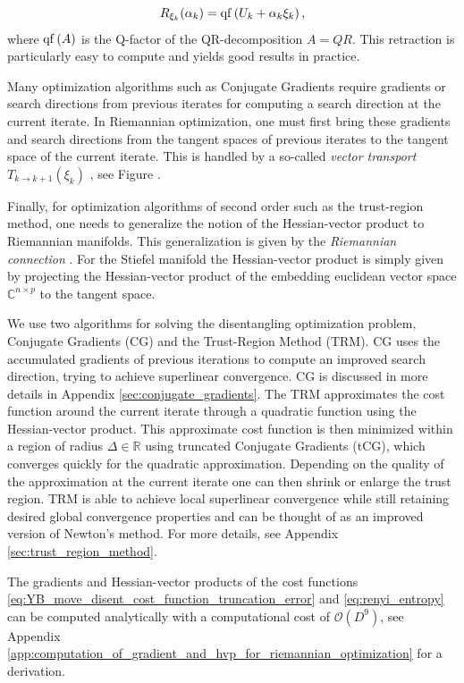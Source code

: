\begin{equation}
	R_{\xi_k}(\alpha_k) = \operatorname{qf}\left(U_k + \alpha_k\xi_k\right),
\end{equation}
where $\operatorname{qf}\left(A\right)$ is the Q-factor of the QR-decomposition $A = QR$. This retraction is particularly easy to compute and yields good results in practice. \par
Many optimization algorithms such as Conjugate Gradients require gradients or search directions from previous iterates for computing a search direction at the current iterate. In Riemannian optimization, one must first bring these gradients and search directions from the tangent spaces of previous iterates to the tangent space of the current iterate. This is handled by a so-called \textit{vector transport} $T_{k\rightarrow k+1}\left(\xi_k\right)$ \cite{cite:optimization_on_matrix_manifolds}, see Figure . \par
Finally, for optimization algorithms of second order such as the trust-region method, one needs to generalize the notion of the Hessian-vector product to Riemannian manifolds. This generalization is given by the \textit{Riemannian connection} \cite{cite:optimization_on_matrix_manifolds}. For the Stiefel manifold the Hessian-vector product is simply given by projecting the Hessian-vector product of the embedding euclidean vector space $\mathbb{C}^{n\times p}$ to the tangent space. \par
We use two algorithms for solving the disentangling optimization problem, Conjugate Gradients (CG) and the Trust-Region Method (TRM). CG uses the accumulated gradients of previous iterations to compute an improved search direction, trying to achieve superlinear convergence. CG is discussed in more details in Appendix \ref{sec:conjugate_gradients}. The TRM approximates the cost function around the current iterate through a quadratic function using the Hessian-vector product. This approximate cost function is then minimized within a region of radius $\Delta\in\mathbb{R}$ using truncated Conjugate Gradients (tCG), which converges quickly for the quadratic approximation. Depending on the quality of the approximation at the current iterate one can then shrink or enlarge the trust region. TRM is able to achieve local superlinear convergence while still retaining desired global convergence properties \cite{cite:optimization_on_matrix_manifolds} and can be thought of as an improved version of Newton's method. For more details, see Appendix \ref{sec:trust_region_method}. \par
The gradients and Hessian-vector products of the cost functions \eqref{eq:YB_move_disent_cost_function_truncation_error} and \eqref{eq:renyi_entropy} can be computed analytically with a computational cost of $\mathcal{O}(D^9)$, see Appendix \ref{app:computation_of_gradient_and_hvp_for_riemannian_optimization} for a derivation.
